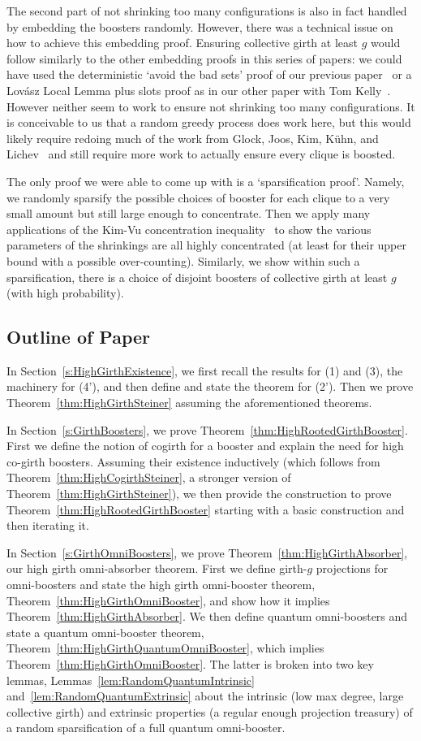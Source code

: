 \documentclass[11pt]{article}
\newcounter{i}
\theoremstyle{plain}
\theoremstyle{plain} %
\theoremstyle{definition}
\begin{document}
The second part of not shrinking too many configurations is also in fact handled by embedding the boosters randomly. However, there was a technical issue on how to achieve this embedding proof. Ensuring collective girth at least $g$ would follow similarly to the other embedding proofs in this series of papers: we could have used the deterministic `avoid the bad sets' proof of our previous paper~\cite{DPI} or a Lov\'asz Local Lemma plus slots proof as in our other paper with Tom Kelly~\cite{DKPIV}. However neither seem to work to ensure not shrinking too many configurations. It is conceivable to us that a random greedy process does work here, but this would likely require redoing much of the work from Glock, Joos, Kim, K\"{u}hn, and Lichev~\cite{GJKKL22} and still require more work to actually ensure every clique is boosted.

The only proof we were able to come up with is a `sparsification proof'. Namely, we randomly sparsify the possible choices of booster for each clique to a very small amount but still large enough to concentrate. Then we apply many applications of the Kim-Vu concentration inequality~\cite{KV00,V02} to show the various parameters of the shrinkings are all highly concentrated (at least for their upper bound with a possible over-counting). Similarly, we show within such a sparsification, there is a choice of disjoint boosters of collective girth at least $g$ (with high probability). 

\subsection{Outline of Paper}

In Section~\ref{s:HighGirthExistence}, we first recall the results for (1) and (3), the machinery for (4'), and then define and state the theorem for (2'). Then we prove Theorem~\ref{thm:HighGirthSteiner} assuming the aforementioned theorems.

In Section~\ref{s:GirthBoosters}, we prove Theorem~\ref{thm:HighRootedGirthBooster}. First we define the notion of cogirth for a booster and explain the need for high co-girth boosters. Assuming their existence inductively (which follows from Theorem~\ref{thm:HighCogirthSteiner}, a stronger version of Theorem~\ref{thm:HighGirthSteiner}), we then provide the construction to prove Theorem~\ref{thm:HighRootedGirthBooster} starting with a basic construction and then iterating it.

In Section~\ref{s:GirthOmniBoosters}, we prove Theorem~\ref{thm:HighGirthAbsorber}, our high girth omni-absorber theorem. First we define girth-$g$ projections for omni-boosters and state the high girth omni-booster theorem, Theorem~\ref{thm:HighGirthOmniBooster}, and show how it implies Theorem~\ref{thm:HighGirthAbsorber}. We then define quantum omni-boosters and state a quantum omni-booster theorem, Theorem~\ref{thm:HighGirthQuantumOmniBooster}, which implies Theorem~\ref{thm:HighGirthOmniBooster}. The latter is broken into two key lemmas, Lemmas~\ref{lem:RandomQuantumIntrinsic} and~\ref{lem:RandomQuantumExtrinsic} about the intrinsic (low max degree, large collective girth) and extrinsic properties (a regular enough projection treasury) of a random sparsification of a full quantum omni-booster.
\end{document}
